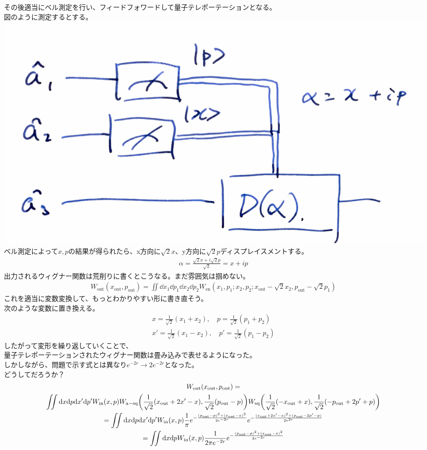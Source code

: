 \documentclass{jsarticle}
\newcommand{\mr}[1]{\mathrm{#1}}
\begin{document}
その後適当にベル測定を行い、フィードフォワードして量子テレポーテーションとなる。\\
図のように測定するとする。\\
\includegraphics[width=0.5\linewidth]{./graphics/disp.pdf}\\
ベル測定によって$x,p$の結果が得られたら、x方向に$\sqrt{2}x$、y方向に$\sqrt{2}p$ディスプレイスメントする。
\begin{gather*}
	\alpha = \frac{\sqrt{2}x + i \sqrt{2}p}{\sqrt{2}} = x + ip
\end{gather*}
出力されるウィグナー関数は荒削りに書くとこうなる。まだ雰囲気は掴めない。\\
\begin{gather*}
	W_\mr{out}(x_\mr{out}, p_\mr{out}) = \iint \dd x_1 \dd p_1 \dd x_2 \dd p_2 W_\mr{en} (x_1,p_1;x_2,p_2;x_\mr{out} - \sqrt{2}x_2,p_\mr{out} - \sqrt{2}p_1)
\end{gather*}
これを適当に変数変換して、もっとわかりやすい形に書き直そう。\\
次のような変数に置き換える。
\begin{gather*}
	x = \frac{1}{\sqrt{2}}( x_1 + x_2 ), \quad p = \frac{1}{\sqrt{2}} ( p_1 + p_2 )\\
	x' =  \frac{1}{\sqrt{2}}( x_1 - x_2 ), \quad p' = \frac{1}{\sqrt{2}} ( p_1 - p_2 )
\end{gather*}
したがって変形を繰り返していくことで、\\
量子テレポーテーションされたウィグナー関数は畳み込みで表せるようになった。\\
しかしながら、問題で示す式とは異なり$e^{-2r} \rightarrow 2e^{-2r}$となった。\\
どうしてだろうか？
\begin{gather*}
	W_\mr{out}(x_\mr{out}, p_\mr{out}) =\\
	\iint \dd x \dd p \dd x' \dd p'
	W_\mr{in} (x,p) 
	W_\mr{a-sq} \qty( \frac{1}{\sqrt{2}} ( x_\mr{out} + 2x' - x ), \frac{1}{\sqrt{2}} (p_\mr{out} - p))
	W_\mr{sq} \qty(  \frac{1}{\sqrt{2}} (-x_\mr{out} + x)   ,   \frac{1}{\sqrt{2}} ( -p_\mr{out} + 2p' + p ) )\\
	= \iint \dd x \dd p \dd x' \dd p' W_\mr{in} (x,p) \frac{1}{\pi} e^{- \frac{(p_\mr{out} - p)^2 + (x_\mr{out} - x)^2}{2 e^{-2r}}}
	e^{-\frac{(x_\mr{out}+2x' - x)^2 + (p_\mr{out} - 2p' -p)}{2e^{2r}}}\\
	= \iint \dd x \dd p W_\mr{in}(x,p) \frac{1}{2\pi e^{-2r}} e^{- \frac{(p_\mr{out} - p)^2 + (x_\mr{out} - x)^2}{2 e^{-2r}}}
\end{gather*}
\end{document}
